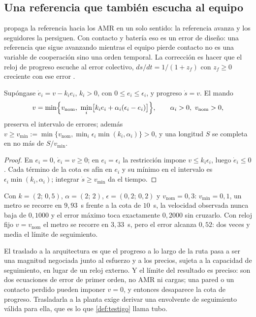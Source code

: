 \subsection{Una referencia que también escucha al equipo}

 propaga la referencia hacia los AMR en un solo
sentido: la referencia avanza y los seguidores la persiguen. Con contacto y
batería eso es un error de diseño: una referencia que sigue avanzando mientras
el equipo pierde contacto no es una variable de cooperación sino una orden
temporal. La corrección es hacer que el reloj de progreso escuche al error
colectivo, $ds/dt=1/(1+z_f)$ con $z_f\ge0$ creciente con ese error
\cite{ren2008distributed,mayorga2026m1}.

\begin{proposicion}
\label{pr:reloj-seguro}
Supóngase $\dot e_i=v-k_ie_i$, $k_i>0$, con $0\le e_i\le\epsilon_i$, y progreso
$\dot s=v$. El mando
\[
  v=\min\Bigl\{v_{\mathrm{nom}},\ \min_i\bigl[k_ie_i+\alpha_i(\epsilon_i-e_i)\bigr]\Bigr\},
  \qquad \alpha_i>0,\ v_{\mathrm{nom}}>0,
\]
preserva el intervalo de errores; además
$v\ge v_{\min}:=\min\{v_{\mathrm{nom}},\min_i\epsilon_i\min(k_i,\alpha_i)\}>0$,
y una longitud $S$ se completa en no más de $S/v_{\min}$.
\end{proposicion}

\begin{proof}
En $e_i=0$, $\dot e_i=v\ge0$; en $e_i=\epsilon_i$ la restricción impone
$v\le k_i\epsilon_i$, luego $\dot e_i\le0$. Cada término de la cota es afín en
$e_i$ y su mínimo en el intervalo es $\epsilon_i\min(k_i,\alpha_i)$; integrar
$\dot s\ge v_{\min}$ da el tiempo.
\end{proof}

\begin{observacion}
\label{obs:reloj-num}
Con $k=(2;\,0{,}5)$, $\alpha=(2;\,2)$, $\epsilon=(0{,}2;\,0{,}2)$ y
$v_{\mathrm{nom}}=0{,}3$: $v_{\min}=0{,}1$, un metro se recorre en $9{,}93$~s
frente a la cota de $10$~s, la velocidad observada nunca baja de $0{,}1000$ y el
error máximo toca exactamente $0{,}2000$ sin cruzarlo. Con reloj fijo
$v=v_{\mathrm{nom}}$ el metro se recorre en $3{,}33$~s, pero el error alcanza
$0{,}52$: dos veces y media el límite de seguimiento.

El traslado a la arquitectura es que el progreso a lo largo de la ruta pasa a ser
una magnitud negociada junto al esfuerzo y a los precios, sujeta a la capacidad
de seguimiento, en lugar de un reloj externo. Y el límite del resultado es
preciso: son dos ecuaciones de error de primer orden, no AMR ni cargas; una
pared o un contacto perdido pueden imponer $v=0$, y entonces desaparece la cota
de progreso. Trasladarla a la planta exige derivar una envolvente de
seguimiento válida para ella, que es lo que \cref{def:testigo} llama tubo.
\end{observacion}

